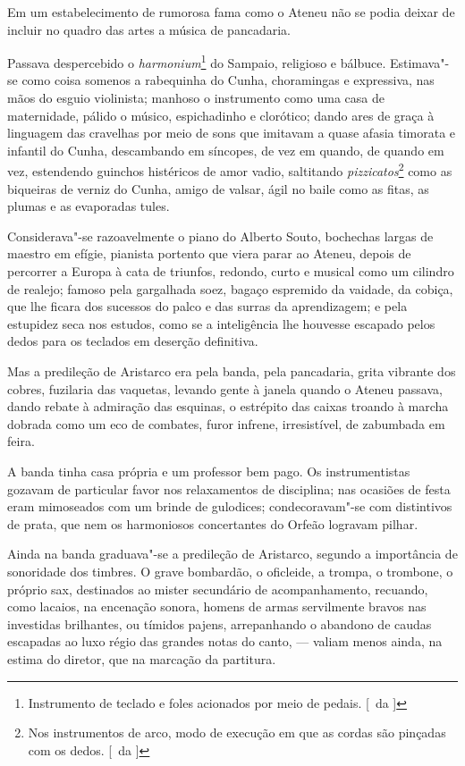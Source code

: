 Em um estabelecimento de
rumorosa fama como o Ateneu não se podia deixar de incluir no quadro
das artes a música de pancadaria. 


Passava despercebido o \textit{harmonium}\footnote{ Instrumento de teclado 
e foles acionados por meio de pedais. [~da ]} do
Sampaio, religioso e bálbuce. Estimava"-se como coisa somenos a
rabequinha do Cunha, choramingas e expressiva, nas mãos do esguio
violinista; manhoso o instrumento como uma casa de maternidade, pálido
o músico, espichadinho e clorótico; dando ares de graça à linguagem das
cravelhas por meio de sons que imitavam a quase afasia timorata e
infantil do Cunha, descambando em síncopes, de vez em quando, de quando
em vez, estendendo guinchos histéricos de amor vadio, saltitando
\textit{pizzicatos}\footnote{ Nos instrumentos de arco, modo de execução em  
que as cordas são pinçadas com os dedos. [~da ]}
como as biqueiras de verniz do Cunha, amigo de valsar, ágil
no baile como as fitas, as plumas e as evaporadas tules.


Considerava"-se razoavelmente o piano do Alberto Souto, bochechas
largas de maestro em efígie, pianista portento que viera parar ao
Ateneu, depois de percorrer a Europa à cata de triunfos, redondo, curto
e musical como um cilindro de realejo; famoso pela gargalhada soez,
bagaço espremido da vaidade, da cobiça, que lhe ficara dos sucessos do
palco e das surras da aprendizagem; e pela estupidez seca nos estudos,
como se a inteligência lhe houvesse escapado pelos dedos para os
teclados em deserção definitiva. 

Mas a predileção de Aristarco era pela
banda, pela pancadaria, grita vibrante dos cobres, fuzilaria das
vaquetas, levando gente à janela quando o Ateneu passava, dando rebate
à admiração das esquinas, o estrépito das caixas troando à marcha
dobrada como um eco de combates, furor infrene, irresistível, de
zabumbada em feira. 

A banda tinha casa própria e um professor bem pago.
Os instrumentistas gozavam de particular favor nos relaxamentos de
disciplina; nas ocasiões de festa eram mimoseados com um brinde de
gulodices; condecoravam"-se com distintivos de prata, que nem os
harmoniosos concertantes do Orfeão logravam pilhar. 

Ainda na banda
graduava"-se a predileção de Aristarco, segundo a importância de
sonoridade dos timbres. O grave bombardão, o oficleide, a trompa, o
trombone, o próprio sax, destinados ao mister secundário de
acompanhamento, recuando, como lacaios, na encenação sonora, homens de
armas servilmente bravos nas investidas brilhantes, ou tímidos pajens,
arrepanhando o abandono de caudas escapadas ao luxo régio das grandes
notas do canto, --- valiam menos ainda, na estima do diretor, que na
marcação da partitura. 


